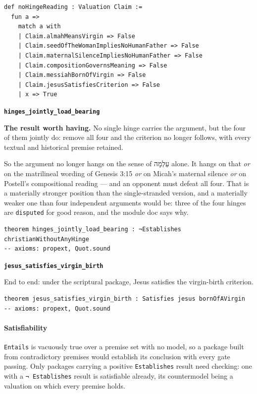 \documentclass[11pt]{article}
\begin{document}
{\small\begin{verbatim}
def noHingeReading : Valuation Claim :=
  fun a =>
    match a with
    | Claim.almahMeansVirgin => False
    | Claim.seedOfTheWomanImpliesNoHumanFather => False
    | Claim.maternalSilenceImpliesNoHumanFather => False
    | Claim.compositionGovernsMeaning => False
    | Claim.messiahBornOfVirgin => False
    | Claim.jesusSatisfiesCriterion => False
    | x => True
\end{verbatim}}
\par\medskip\noindent\textbf{\texttt{hinges\_\allowbreak{}jointly\_\allowbreak{}load\_\allowbreak{}bearing}}\par\nobreak\noindent
\textbf{The result worth having.} No single hinge carries the argument, but the four of them jointly do: remove all four and the criterion no longer follows, with every textual and historical premise retained.

So the argument no longer hangs on the sense of עַלְמָה alone. It hangs on that \emph{or} on the matrilineal wording of Genesis 3:15 \emph{or} on Micah's maternal silence \emph{or} on Postell's compositional reading — and an opponent must defeat all four. That is a materially stronger position than the single-stranded version, and a materially weaker one than four independent arguments would be: three of the four hinges are \texttt{disputed} for good reason, and the module doc says why.

{\small\begin{verbatim}
theorem hinges_jointly_load_bearing : ¬Establishes christianWithoutAnyHinge
-- axioms: propext, Quot.sound
\end{verbatim}}
\par\medskip\noindent\textbf{\texttt{jesus\_\allowbreak{}satisfies\_\allowbreak{}virgin\_\allowbreak{}birth}}\par\nobreak\noindent
End to end: under the scriptural package, Jesus satisfies the virgin-birth criterion.

{\small\begin{verbatim}
theorem jesus_satisfies_virgin_birth : Satisfies jesus bornOfAVirgin
-- axioms: propext, Quot.sound
\end{verbatim}}
\paragraph*{Satisfiability}
\leavevmode\par
\texttt{Entails} is vacuously true over a premise set with no model, so a package built from contradictory premises would establish its conclusion with every gate passing. Only packages carrying a positive \texttt{Establishes} result need checking: one with a \texttt{¬ Establishes} result is satisfiable already, its countermodel being a valuation on which every premise holds.
\end{document}
